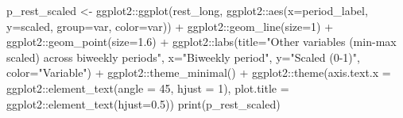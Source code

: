 \documentclass[
  letterpaper,
  DIV=11,
  numbers=noendperiod]{scrartcl}
\newenvironment{Shaded}{\begin{snugshade}}{\end{snugshade}}
\newcommand{\AttributeTok}[1]{\textcolor[rgb]{0.40,0.45,0.13}{#1}}
\newcommand{\DecValTok}[1]{\textcolor[rgb]{0.68,0.00,0.00}{#1}}
\newcommand{\FloatTok}[1]{\textcolor[rgb]{0.68,0.00,0.00}{#1}}
\newcommand{\FunctionTok}[1]{\textcolor[rgb]{0.28,0.35,0.67}{#1}}
\newcommand{\NormalTok}[1]{\textcolor[rgb]{0.00,0.23,0.31}{#1}}
\newcommand{\OtherTok}[1]{\textcolor[rgb]{0.00,0.23,0.31}{#1}}
\newcommand{\SpecialCharTok}[1]{\textcolor[rgb]{0.37,0.37,0.37}{#1}}
\newcommand{\StringTok}[1]{\textcolor[rgb]{0.13,0.47,0.30}{#1}}
\begin{document}
\begin{Shaded}
\begin{Highlighting}[]
\NormalTok{  p\_rest\_scaled }\OtherTok{\textless{}{-}}\NormalTok{ ggplot2}\SpecialCharTok{::}\FunctionTok{ggplot}\NormalTok{(rest\_long, ggplot2}\SpecialCharTok{::}\FunctionTok{aes}\NormalTok{(}\AttributeTok{x=}\NormalTok{period\_label, }\AttributeTok{y=}\NormalTok{scaled, }\AttributeTok{group=}\NormalTok{var, }\AttributeTok{color=}\NormalTok{var)) }\SpecialCharTok{+}
\NormalTok{    ggplot2}\SpecialCharTok{::}\FunctionTok{geom\_line}\NormalTok{(}\AttributeTok{size=}\DecValTok{1}\NormalTok{) }\SpecialCharTok{+}
\NormalTok{    ggplot2}\SpecialCharTok{::}\FunctionTok{geom\_point}\NormalTok{(}\AttributeTok{size=}\FloatTok{1.6}\NormalTok{) }\SpecialCharTok{+}
\NormalTok{    ggplot2}\SpecialCharTok{::}\FunctionTok{labs}\NormalTok{(}\AttributeTok{title=}\StringTok{"Other variables (min{-}max scaled) across biweekly periods"}\NormalTok{, }\AttributeTok{x=}\StringTok{"Biweekly period"}\NormalTok{, }\AttributeTok{y=}\StringTok{"Scaled (0{-}1)"}\NormalTok{, }\AttributeTok{color=}\StringTok{"Variable"}\NormalTok{) }\SpecialCharTok{+}
\NormalTok{    ggplot2}\SpecialCharTok{::}\FunctionTok{theme\_minimal}\NormalTok{() }\SpecialCharTok{+}
\NormalTok{    ggplot2}\SpecialCharTok{::}\FunctionTok{theme}\NormalTok{(}\AttributeTok{axis.text.x =}\NormalTok{ ggplot2}\SpecialCharTok{::}\FunctionTok{element\_text}\NormalTok{(}\AttributeTok{angle =} \DecValTok{45}\NormalTok{, }\AttributeTok{hjust =} \DecValTok{1}\NormalTok{), }\AttributeTok{plot.title =}\NormalTok{ ggplot2}\SpecialCharTok{::}\FunctionTok{element\_text}\NormalTok{(}\AttributeTok{hjust=}\FloatTok{0.5}\NormalTok{))}
  \FunctionTok{print}\NormalTok{(p\_rest\_scaled)}
  

\end{Highlighting}
\end{Shaded}
\end{document}
